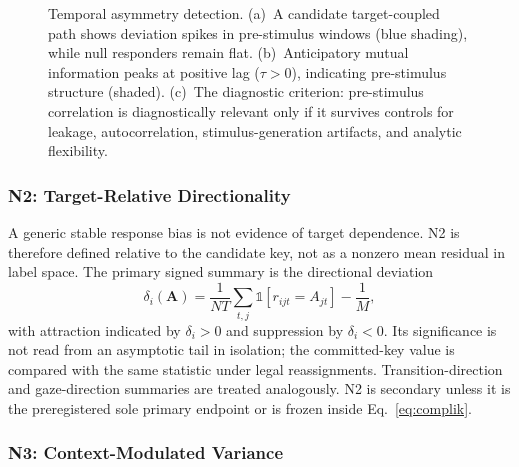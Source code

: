 \documentclass[11pt,letterpaper]{article}
\begin{document}
\begin{figure}[t]
\caption{Temporal asymmetry detection. (a)~A candidate target-coupled path shows deviation spikes in pre-stimulus windows (blue shading), while null responders remain flat. (b)~Anticipatory mutual information peaks at positive lag ($\tau > 0$), indicating pre-stimulus structure (shaded). (c)~The diagnostic criterion: pre-stimulus correlation is diagnostically relevant only if it survives controls for leakage, autocorrelation, stimulus-generation artifacts, and analytic flexibility.}
\label{fig:temporal}
\end{figure}

\subsubsection{N2: Target-Relative Directionality}
A generic stable response bias is not evidence of target dependence. N2 is therefore defined relative to the candidate key, not as a nonzero mean residual in label space. The primary signed summary is the directional deviation
\begin{equation}
\delta_i(\mathbf{A})=\frac{1}{NT}\sum_{t,j}\mathbb{1}[r_{ijt}=A_{jt}]-\frac{1}{M},
\label{eq:n2target}
\end{equation}
with attraction indicated by $\delta_i>0$ and suppression by $\delta_i<0$. Its significance is not read from an asymptotic tail in isolation; the committed-key value is compared with the same statistic under legal reassignments. Transition-direction and gaze-direction summaries are treated analogously. N2 is secondary unless it is the preregistered sole primary endpoint or is frozen inside Eq.~\ref{eq:complik}.

\subsubsection{N3: Context-Modulated Variance}
\end{document}
